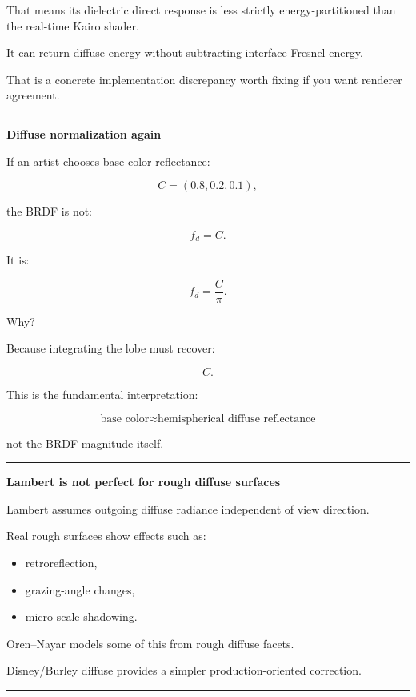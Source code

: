 That means its dielectric direct response is less strictly energy-partitioned than the real-time Kairo shader.

It can return diffuse energy without subtracting interface Fresnel energy.

That is a concrete implementation discrepancy worth fixing if you want renderer agreement.

\begin{center}\rule{0.5\linewidth}{0.5pt}\end{center}

\textbf{Diffuse normalization again}

If an artist chooses base-color reflectance:

\[
C=(0.8,0.2,0.1),
\]

the BRDF is not:

\[
f_d=C.
\]

It is:

\[
\boxed{
f_d=\frac{C}{\pi}.
}
\]

Why?

Because integrating the lobe must recover:

\[
C.
\]

This is the fundamental interpretation:

\[
\boxed{
\text{base color}
\approx
\text{hemispherical diffuse reflectance}
}
\]

not the BRDF magnitude itself.

\begin{center}\rule{0.5\linewidth}{0.5pt}\end{center}

\textbf{Lambert is not perfect for rough diffuse surfaces}

Lambert assumes outgoing diffuse radiance independent of view direction.

Real rough surfaces show effects such as:

\begin{itemize}
\tightlist
\item
  retroreflection,
\item
  grazing-angle changes,
\item
  micro-scale shadowing.
\end{itemize}

Oren--Nayar models some of this from rough diffuse facets.

Disney/Burley diffuse provides a simpler production-oriented correction.

\begin{center}\rule{0.5\linewidth}{0.5pt}\end{center}

